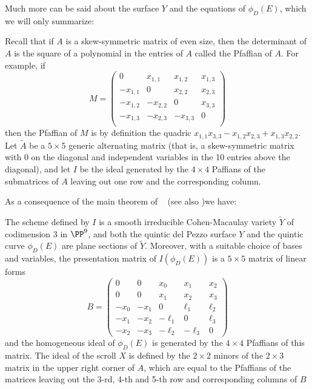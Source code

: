 Much more can be said about the surface $Y$ and the equations of $\phi_D(E)$, which we will only summarize:

\begin{fact}

Recall that if $A$ is a skew-symmetric matrix of even size,
then the determinant of $A$ is the square of a polynomial in the entries of $A$ called the Pfaffian of $A$. For example, if
$$
M = \begin{pmatrix}
0&x_{1,1}&x_{1,2}&x_{1,3}\\
-x_{1,1}&0&x_{2,2}&x_{2,3}\\
-x_{1,2}&-x_{2,2}&0&x_{3,3}\\
-x_{1,3}&-x_{2,3}&-x_{3,3}&0\\
\end{pmatrix}
$$
then the Pfaffian of $M$ is by definition the quadric $x_{1,1}x_{3,3}-x_{1,2}x_{2,3}+x_{1,3}x_{2,2}$.
Let $\tilde A$ be a $5\times 5$ generic alternating matrix (that is, a skew-symmetric matrix with 0 on the diagonal and independent variables
in the 10 entries above the diagonal), and let $I$ be the ideal generated by the $4\times 4$ Paffians of
the submatrices of $A$ leaving out one row and the corresponding column.

As a consequence of the main theorem of ~\cite{MR453723} (see also \cite[Theorem 11]{Eisenbud1995})we have:

\begin{proposition} \label{5x5 Pfaffians}

The scheme defined by $I$ is a smooth irreducible Cohen-Macaulay variety $\tilde Y$ of codimension 3 in $\PP^9$,
and both the quintic del Pezzo surface $Y$ and the quintic curve $\phi_D(E)$ are plane sections of $\tilde Y$.
Moreover, with a suitable choice of bases and variables,  the presentation matrix of $I(\phi_D(E))$ is
a $5\times 5$ matrix of linear forms 
$$
B =\begin{pmatrix}
0&0&x_0&x_1&x_2\\
0&0&x_1&x_2&x_3\\
-x_0&-x_1&0&\ell_1&\ell_2\\
-x_1&-x_2&-\ell_1&0&\ell_3\\
-x_2&-x_3&-\ell_2&-\ell_3&0
\end{pmatrix}
$$
and
the homogeneous ideal of $\phi_D(E)$ is generated by the  $4\times 4$ Pfaffians of this matrix. The ideal of 
the scroll $X$ is defined by the $2\times 2$ minors of the $2\times 3$ matrix in the upper right corner of $A$, which
are equal to the Pfaffians of the matrices leaving out the 3-rd, 4-th and 5-th row and corresponding columns of $B$
\end{proposition}
\end{fact}

